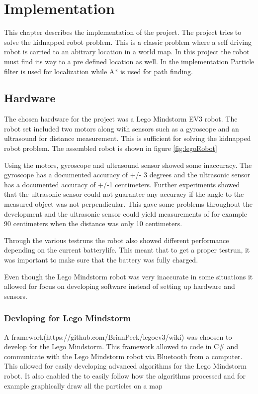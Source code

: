 \chapter{Implementation}
\label{chp:impl}

This chapter describes the implementation of the project. The project tries to solve the kidnapped robot problem. This is a classic problem where a self driving robot is carried to an abitrary location in a world map. In this project the robot must find its way to a pre defined location as well. In the implementation Particle filter is used for localization while A* is used for path finding.

\section{Hardware}
The chosen hardware for the project was a Lego Mindstorm EV3 robot. The robot set included two motors along with sensors such as a gyroscope and an ultrasound for distance measurement. This is sufficient for solving the kidnapped robot problem. The assembled robot is shown in figure \ref{fig:legoRobot}

\FloatBarrier

Using the motors, gyroscope and ultrasound sensor showed some inaccuracy.  The gyroscope has a documented accuracy of +/- 3 degrees and the ultrasonic sensor has a documented accuracy of +/-1 centimeters. Further experiments showed that the ultrasonic sensor could not guarantee any accuracy if the angle to the measured object was not perpendicular. This gave some problems throughout the development and the ultrasonic sensor could yield measurements of for example 90 centimeters when the distance was only 10 centimeters. 

Through the various testruns the robot also showed different performance depending on the current batterylife. This meant that to get a proper testrun, it was important to make sure that the battery was fully charged. 

Even though the Lego Mindstorm robot was very inaccurate in some situations it allowed for focus on developing software instead of setting up hardware and sensors. 

\subsection{Devloping for Lego Mindstorm}
A framework(https://github.com/BrianPeek/legoev3/wiki) was choosen to develop for the Lego Mindstorm. This framework allowed to code in C\# and communicate with the Lego Mindstorm robot via Bluetooth from a computer. This allowed for easily developing advanced algorithms for the Lego Mindstorm robot. It also enabled the to easily follow how the algorithms processed and for example graphically draw all the particles on a map

